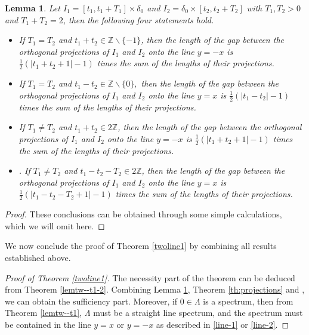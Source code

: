 \documentclass[12pt,a4paper,intlimits,sumlimits]{amsart}
\theoremstyle{plain}
\newtheorem{lemma}{Lemma}
\theoremstyle{definition}
\newcounter{rem}
\begin{document}
\begin{lemma} \label{pro-2}
 Let $I_1= [t_1, t_1+T_1]\times\delta_0$ and $ I_2=\delta_0\times [t_2, t_2+T_2]$ with $T_1, T_2>0$ and $T_1+T_2=2$, then the following four statements hold.
 \begin{itemize}
\item[(I)] 
 If $T_1=T_2$ and $ t_1+t_2 \in\mathbb{Z} \backslash\{-1\}$,  then the length of the gap between the orthogonal projections of  $I_1$ and $I_2$  onto the line 
 $y=-x$ is $\frac{1}{2}(|t_1+t_2+1|-1)$ times the sum of the lengths of their projections. 
\item[(II)]  If $T_1=T_2$ and  $  t_1-t_2 \in \mathbb{Z} \backslash\{0\},$  then the length of the gap between the orthogonal projections of  $I_1$ and $I_2$  onto the line 
 $y=x$ is $\frac{1}{2}(|t_1-t_2|-1)$ times the sum of the lengths of their projections.   
\item[(III)]   If $T_1\neq T_2$ and $t_1+t_2\in 2\mathbb{Z}$, then the length of the gap between the orthogonal projections of  $I_1$ and $I_2$  onto the line 
 $y=-x$ is $\frac{1}{2}(|t_1+t_2+1|-1)$ times the sum of the lengths of their projections.
\item[(IV)] . If $T_1\neq T_2$ and $t_1-t_2-T_2\in 2\mathbb{Z}$, then the length of the gap between the orthogonal projections of  $I_1$ and $I_2$  onto the line 
 $y=x$ is $\frac{1}{2}(|t_1-t_2-T_2+1|-1)$ times the sum of the lengths of their projections.  \end{itemize} 
 \end{lemma}
\begin{proof}These conclusions can be obtained through some simple calculations, which we will omit here.

\end{proof}
 We now conclude the proof of Theorem \ref{twoline1} by combining all  results established above. 
\begin{proof}[Proof of Theorem \ref{twoline1}]  
The necessity part of the theorem can  be deduced from Theorem  \ref{lemtw--t1-2}.  Combining Lemma \ref{pro-2}, Theorem \ref{th:projections} and \cite[Theorem 1.1] {laba2001}, we can  obtain the sufficiency part. Moreover, if $0\in\Lambda$ is a spectrum, then from Theorem \ref{lemtw--t1}, $\Lambda$ must be a straight line spectrum, and the spectrum must be contained in the line $y=x$ or $y=-x$  as   described in  \eqref{line-1} or \eqref{line-2}.

\end{proof}
\end{document}
